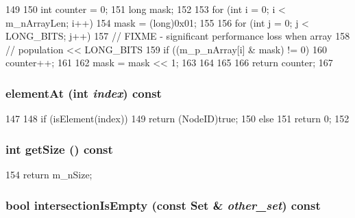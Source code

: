 \begin{DoxyCode}
149 {
150     int counter = 0;
151     long mask;
152 
153     for (int i = 0; i < m_nArrayLen; i++) {
154         mask = (long)0x01;
155 
156         for (int j = 0; j < LONG_BITS; j++) {
157             // FIXME - significant performance loss when array
158             // population << LONG_BITS
159             if ((m_p_nArray[i] & mask) != 0) {
160                 counter++;
161             }
162             mask = mask << 1;
163         }
164     }
165 
166     return counter;
167 }
\end{DoxyCode}
\hypertarget{classSet_ace4040d47fd875f3fac8516a49d5b416}{
\subsubsection[{elementAt}]{ elementAt (int {\em index}) const}}
\label{classSet_ace4040d47fd875f3fac8516a49d5b416}



\begin{DoxyCode}
147     {
148         if (isElement(index))
149             return (NodeID)true;
150         else
151             return 0;
152     }
\end{DoxyCode}
\hypertarget{classSet_a4f8dbb76319fe40792867d6ca51ef447}{
\subsubsection[{getSize}]{\setlength{\rightskip}{0pt plus 5cm}int getSize () const}}
\label{classSet_a4f8dbb76319fe40792867d6ca51ef447}



\begin{DoxyCode}
154 { return m_nSize; }
\end{DoxyCode}
\hypertarget{classSet_a6746cdf4bc4e7e90ce81d368ac57c125}{
\subsubsection[{intersectionIsEmpty}]{\setlength{\rightskip}{0pt plus 5cm}bool intersectionIsEmpty (const {\bf Set} \& {\em other\_\-set}) const}}
\label{classSet_a6746cdf4bc4e7e90ce81d368ac57c125}



